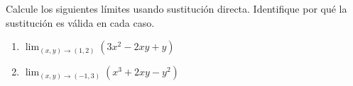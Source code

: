 Calcule los siguientes límites usando sustitución directa. Identifique por qué la sustitución es válida en cada caso.
\begin{enumerate}
    \item $\displaystyle\lim_{(x,y) \to (1,2)} \left(3x^2 - 2xy + y\right)$
    \item $\displaystyle\lim_{(x,y) \to (-1,3)} \left(x^3 + 2xy - y^2\right)$
\end{enumerate}
